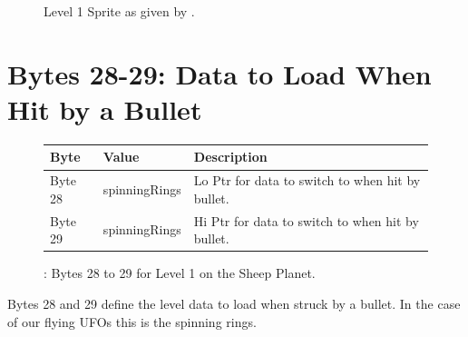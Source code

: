 \begin{figure}[H]
  {
    \setlength{\tabcolsep}{3.0pt}
    \setlength\cmidrulewidth{\heavyrulewidth} %
	\centering
	\def\MULTICOLORONE{white}
	\def\MULTICOLORTWO{red}
	\def\SPRITECOLOR{c64_purple}
	\begin{subfigure}{0.3\textwidth}
		
	\end{subfigure}
	\begin{subfigure}{0.3\textwidth}
		
	\end{subfigure}
	\begin{subfigure}{0.3\textwidth}
		
	\end{subfigure}
}\caption[position=top]{Level 1 Sprite as given by .}
\end{figure}

\section{Bytes 28-29: Data to Load When Hit by a Bullet}
\begin{figure}[H]

  {
    \setlength{\tabcolsep}{3.0pt}
    \setlength\cmidrulewidth{\heavyrulewidth} %
    \begin{adjustbox}{width=13cm}

      \begin{tabular}{lll}
        \toprule
        Byte    & Value                     & Description                                                        \\
        \midrule
 Byte 28 & spinningRings\index{spinningRings}             & Lo Ptr for data to switch to when hit by bullet.                                    \\
 Byte 29 & spinningRings\index{spinningRings}             & Hi Ptr for data to switch to when hit by bullet.                                    \\
        \bottomrule
      \end{tabular}
    \end{adjustbox}
  }\caption{: Bytes 28 to 29 for Level 1 on the Sheep Planet.}
\end{figure}

Bytes 28 and 29 define the level data to load when struck by a bullet. In the case of our
flying UFOs this is the spinning rings.

